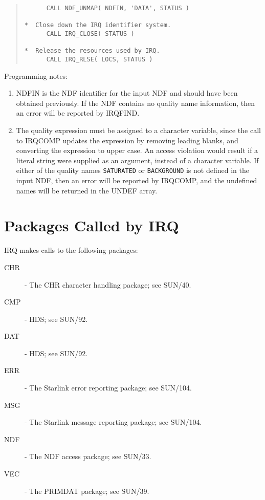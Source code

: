 \documentclass[twoside,11pt]{article}
\newcommand{\htmlref}[2]{#1}
\newcommand{\xref}[3]{#1}
\renewcommand{\_}{\texttt{\symbol{95}}}
\begin{document}
\begin{quote}
\begin{tabbing}
\verb#      CALL NDF_UNMAP( NDFIN, 'DATA', STATUS )          #\\
\verb#                                                       #\\
\verb#*  Close down the IRQ identifier system.               #\\
\verb#      CALL IRQ_CLOSE( STATUS )                         #\\
\verb#                                                       #\\
\verb#*  Release the resources used by IRQ.                  #\\
\verb#      CALL IRQ_RLSE( LOCS, STATUS )                    #\\

\end{tabbing}
\end{quote}

Programming notes:

\begin{enumerate}

\label{NOTE1}
\item NDFIN is the NDF identifier for the input NDF and should have been
obtained previously. If the NDF contains no quality name information, then
an error will be reported by \htmlref{IRQ\_FIND}{IRQ_FIND}.

\label{NOTE2}
\item The quality expression must be assigned to a character variable,
since the call to \htmlref{IRQ\_COMP}{IRQ_COMP} updates the expression by
removing leading blanks, and converting the expression to upper case. An
access violation would result if a literal string were supplied as an
argument, instead of a character variable. If either of the quality names
{\tt SATURATED} or {\tt BACKGROUND} is not defined in the input NDF, then
an error will be reported by IRQ\_COMP, and the undefined names will be
returned in the UNDEF array. 

\end{enumerate}

\section {Packages Called by IRQ}

IRQ\_ makes calls to the following packages:
\begin {description}
\item [CHR\_] - The CHR character handling package; see \xref{SUN/40}{sun40}{}.
\item [CMP\_] - HDS; see  \xref{SUN/92}{sun92}{}.
\item [DAT\_] - HDS; see SUN/92.
\item [ERR\_] - The Starlink error reporting package; see \xref{SUN/104}{sun104}{}.
\item [MSG\_] - The Starlink message reporting package; see SUN/104.
\item [NDF\_] - The NDF access package; see  \xref{SUN/33}{sun33}{}.
\item [VEC\_] - The PRIMDAT package; see  \xref{SUN/39}{sun39}{}.
\end{description}
\end{document}

